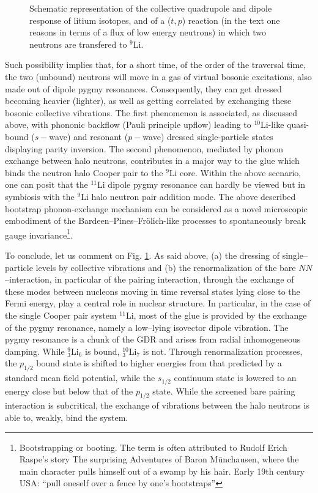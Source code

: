\begin{subappendices}
\begin{figure}[h!]
\begin{center}
	\end{center}
	\caption{Schematic representation of the collective quadrupole and dipole response of litium isotopes, and of a ($t,p$) reaction (in the text one reasons in terms of a flux of low energy neutrons) in which two neutrons are transfered to $^9$Li.}
\label{fig8_A_1}
\end{figure}
Such possibility implies that, for a short time, of the order of the traversal time, the two (unbound) neutrons will move in a gas of virtual bosonic excitations, also made out of dipole pygmy resonances. Consequently, they can get dressed becoming heavier (lighter), as well as getting correlated by exchanging  these bosonic collective vibrations. 
The first phenomenon is associated, as discussed above, with phononic backflow (Pauli principle upflow) leading to $^{10}$Li-like quasi-bound ($s-$wave) and resonant ($p-$wave) dressed single-particle states displaying parity inversion.
The second phenomenon, mediated by phonon exchange between halo neutrons, contributes in a major way to the glue which binds the neutron halo Cooper pair to the $^{9}$Li core. Within the above scenario, one can posit that the $^{11}$Li dipole pygmy resonance can hardly be viewed but in symbiosis with the $^9$Li halo neutron pair addition mode. The above described bootstrap phonon-exchange mechanism can be considered as a novel microscopic embodiment of the Bardeen--Pines--Fr\"{o}lich-like processes to spontaneously break gauge invariance\footnote{Bootstrapping or booting. The term is often attributed to Rudolf Erich Raspe's story The surprising Adventures of Baron M\=unchausen, where the main character pulls himself out of a swamp by his hair. Early 19th century USA: ``pull oneself over a fence by one's bootstraps''}.


To conclude, let us comment on Fig. \ref{fig8_A_1}. As said above, (a) the dressing of single--particle levels by collective vibrations and (b) the renormalization of the bare $NN$--interaction, in particular of the pairing interaction, through the exchange of these modes between nucleons moving in time reversal states lying close to the Fermi energy, play a central role in nuclear structure. In particular, in the case of the single Cooper pair system $^{11}$Li, most of the glue is provided by the exchange of the pygmy resonance, namely a low--lying isovector dipole vibration. The pygmy resonance is a chunk of the GDR  and arises from radial inhomogeneous damping.  While $^9_3$Li$_6$ is bound, $^{10}_3$Li$_7$ is not. Through renormalization processes, the $p_{1/2}$ bound state is shifted to higher energies from that predicted by a standard mean field potential, while the $s_{1/2}$ continuum state is lowered to an energy close but  below that of the $p_{1/2}$ state.  While the screened bare pairing interaction is subcritical, the exchange of vibrations between the halo neutrons is able to, weakly, bind the system.







\end{subappendices}
